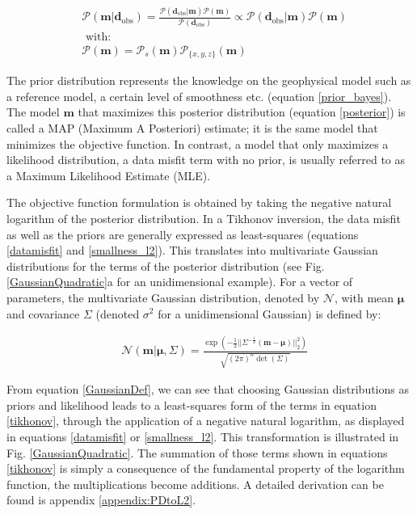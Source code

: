 \documentclass[extra]{gji} %
\begin{document}
\begin{align}
&\mathcal{P}(\mathbf{m}|\mathbf{d}_{\text{obs}}) = \frac{\mathcal{P}(\mathbf{d}_{\text{obs}}|\mathbf{m})\mathcal{P}(\mathbf{m})}{\mathcal{P}(\mathbf{d}_{\text{obs}})} \propto \mathcal{P}(\mathbf{d}_{\text{obs}}|\mathbf{m})\mathcal{P}(\mathbf{m}) \label{posterior}\\
&\text{ with:} \nonumber \\
&\mathcal{P}(\mathbf{m}) = \mathcal{P}_{s}(\mathbf{m})\mathcal{P}_{\{x,y,z\}}(\mathbf{m} \label{prior_bayes})
\end{align}

The prior distribution represents the knowledge on the geophysical model such as a reference model, a certain level of smoothness etc. (equation \ref{prior_bayes}). The model $\mathbf{m}$ that maximizes this posterior distribution (equation \ref{posterior}) is called a MAP (Maximum A Posteriori) estimate; it is the same model that minimizes the objective function. In contrast, a model that only maximizes a likelihood distribution, a data misfit term with no prior, is usually referred to as a Maximum Likelihood Estimate (MLE).

The objective function formulation is obtained by taking the negative natural logarithm of the posterior distribution. In a Tikhonov inversion, the data misfit as well as the priors are generally expressed as least-squares (equations \ref{datamisfit} and \ref{smallness_l2}). This translates into multivariate Gaussian distributions for the terms of the posterior distribution (see Fig. \ref{GaussianQuadratic}a for an unidimensional example). For a vector of parameters, the multivariate Gaussian distribution, denoted by $\mathcal{N}$, with mean $\mathbf{\mu}$ and covariance $\Sigma$ (denoted $\sigma^2$ for a unidimensional Gaussian) is defined by:

\begin{align}
&\mathcal{N}(\mathbf{m}|\mathbf{\mu}, \Sigma) = {\frac{\exp(-\frac{1}{2}||\Sigma^{-\frac{1}{2}}(\mathbf{m}-\mathbf{\mu})||_2^2)}{\sqrt{(2\pi)^n\det(\Sigma)}}} \label{GaussianDef}
\end{align}

From equation \ref{GaussianDef}, we can see that choosing Gaussian distributions as priors and likelihood leads to a least-squares form of the terms in equation \ref{tikhonov}, through the application of a negative natural logarithm, as displayed in equations \ref{datamisfit} or \ref{smallness_l2}. This transformation is illustrated in Fig. \ref{GaussianQuadratic}. The summation of those terms shown in equations \ref{tikhonov} is simply a consequence of the fundamental property of the logarithm function, the multiplications become additions. A detailed derivation can be found is appendix \ref{appendix:PDtoL2}.
\end{document}
